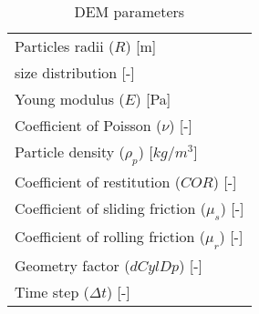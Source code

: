 \begin{table}[h]
\centering
\begin{tabular}{l}
\hline 
    Particles radii ($R$) [m]   \\ [5pt]

	size distribution [-] \\ [5pt]

    Young modulus ($E$) [Pa] \\ [5pt]

    Coefficient of Poisson ($\nu$) [-] \\ 
        \hline
    Particle density ($\rho_p$) [$kg/m^3$] \\ [5pt]
	Coefficient of restitution ($COR$) [-] \\ [5pt]
    Coefficient of sliding friction ($\mu_s$) [-] \\  [5pt]
    Coefficient of rolling friction ($\mu_r$) [-] \\ [5pt]
    Geometry factor ($dCylDp$) [-] \\ [5pt]
    Time step ($\Delta t$) [-] \\ [5pt]


\hline
\end{tabular}
\caption{DEM parameters}
\label{tab:08DEMparameters}
\end{table}

